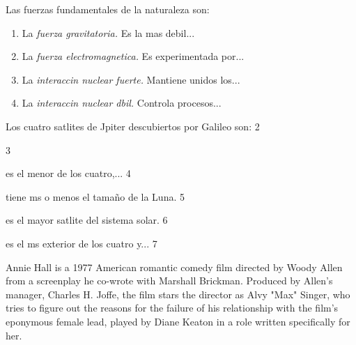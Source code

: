 \documentclass[a4paper,12pt]{article}
\begin{document}
  \noindent Las fuerzas fundamentales de la naturaleza son:
 \begin{enumerate}
 \item La {\em fuerza gravitatoria.} Es la mas debil...
 \item La {\em fuerza electromagnetica.} Es experimentada por...
\item La {\em interaccin nuclear fuerte.} Mantiene unidos los...
 \item La {\em interaccin nuclear dbil.} Controla procesos...
\end{enumerate}

 Los cuatro satlites de Jpiter descubiertos por Galileo son:
2 \begin{description}
3 \item[Europa:] es el menor de los cuatro,...
4 \item[Io:] tiene ms o menos el tama\~{n}o de la Luna.
5 \item[Ganimedes:] es el mayor satlite del sistema solar.
6 \item[Calisto:] es el ms exterior de los cuatro y...
7 \end{description}



\begin{multicols}{3}
 Annie Hall is a 1977 American romantic comedy film directed by Woody Allen from a screenplay he
co-wrote with Marshall Brickman. Produced by Allen’s manager, Charles H. Joffe, the film
stars the director as Alvy "Max" Singer, who tries to figure out the reasons for the failure
of his relationship with the film’s eponymous female lead, played by Diane Keaton in a role
written specifically for her.
 \end{multicols}
\end{document}
